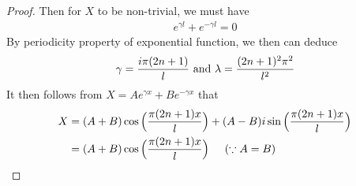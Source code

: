 \documentclass{report}
\begin{document}
\begin{proof}
Then for $X$ to be non-trivial, we must have  
 \begin{align*}
e^{\gamma l}+e^{-\gamma l} =0
\end{align*}
By periodicity property of exponential function, we then can deduce
\begin{align*}
\gamma = \frac{ i \pi(2n+1)}{l}\text{ and }\lambda = \frac{(2n+1)^2\pi ^2}{l^2}
\end{align*}
It then follows from $X=Ae^{\gamma x}+Be^{-\gamma x}$ that 
\begin{align*}
X&= (A+B) \cos \Big(\frac{\pi (2n +1) x}{l}\Big)+ (A-B)i\sin \Big(\frac{ \pi (2n+1)x}{l}\Big)\\
&=(A+B) \cos \Big(\frac{ \pi (2n+1) x}{l}\Big)\hspace{0.5cm}(\because A=B)
\end{align*}
\end{proof}
\end{document}
